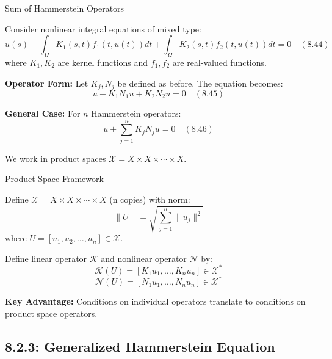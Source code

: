 \documentclass[aspectratio=169,10pt]{beamer}
\begin{document}
\begin{frame}{Sum of Hammerstein Operators}
    \begin{problem}
        Consider nonlinear integral equations of mixed type:
        \[
            u(s) + \int_{\Omega} K_1(s,t) f_1(t, u(t)) dt + \int_{\Omega} K_2(s,t) f_2(t, u(t)) dt = 0
            \quad (8.44)
        \]
        where $K_1, K_2$ are kernel functions and $f_1, f_2$ are real-valued functions.
    \end{problem}

    \vspace{0.3cm}
    \textbf{Operator Form:} Let $K_j, N_j$ be defined as before. The equation becomes:
    \[
        u + K_1 N_1 u + K_2 N_2 u = 0 \quad (8.45)
    \]

    \vspace{0.3cm}
    \textbf{General Case:} For $n$ Hammerstein operators:
    \[
        u + \sum_{j=1}^{n} K_j N_j u = 0 \quad (8.46)
    \]

    We work in product spaces $\mathcal{X} = X \times X \times \cdots \times X$.
\end{frame}

\begin{frame}{Product Space Framework}
    \begin{definition}
        Define $\mathcal{X} = X \times X \times \cdots \times X$ (n copies) with norm:
        \[
            \|U\| = \sqrt{\sum_{j=1}^{n} \|u_j\|^2}
        \]
        where $U = [u_1, u_2, \ldots, u_n] \in \mathcal{X}$.
    \end{definition}

    \vspace{0.3cm}
    Define linear operator $\mathcal{K}$ and nonlinear operator $\mathcal{N}$ by:
    \[
        \mathcal{K}(U) = [K_1 u_1, \ldots, K_n u_n] \in \mathcal{X}^*
    \]
    \[
        \mathcal{N}(U) = [N_1 u_1, \ldots, N_n u_n] \in \mathcal{X}^*
    \]

    \textbf{Key Advantage:} Conditions on individual operators translate to conditions
    on product space operators.
\end{frame}

\subsection{8.2.3: Generalized Hammerstein Equation}
\end{document}
